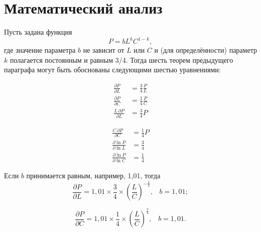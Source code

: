 \documentclass[leqno]{article}  %
\begin{document}
\section{Математический анализ}
Пусть задана функция
\[P=bL^kC^{1-k},\]
где значение параметра \(b\) не зависит от \(L\) или \(C\) и (для определённости) параметр \(k\) полагается постоянным и равным 3/4. Тогда шесть теорем предыдущего параграфа могут быть обоснованы следующими шестью уравнениями:
\begin{multicols}{2}
\begin{align}
\frac{\partial P}{\partial L} &= \frac34 \frac{P}{L}\\
\frac{\partial P}{\partial C} &= \frac14 \frac{P}{C}\\
\frac{L\,\partial P}{\partial L} &= \frac34 P
\end{align}

\begin{align}
\frac{C\,\partial P}{\partial C} &= \frac14 P\\
\frac{\partial \ln P}{\partial \ln L} &= \frac34\\
\frac{\partial \ln P}{\partial \ln C} &= \frac14
\end{align}
\end{multicols}

Если \(b\) принимается равным, например, 1,01, тогда
\begin{equation}
\label{eq:eq7}
\frac{\partial P}{\partial L}=1,\!01 \times \frac34 \times \left(\frac{L}{C}\right)^{-\frac14}\text{,} \quad b=1,\!01;
\end{equation}

\begin{equation}
\label{eq:eq8}
\frac{\partial P}{\partial C}=1,\!01 \times \frac14 \times \left(\frac{L}{C}\right)^\frac34\text{,} \quad b=1,\!01.
\end{equation}
\end{document}
